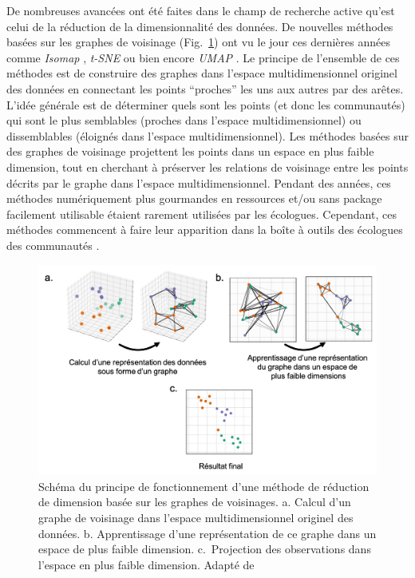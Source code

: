 \begin{refsection}
De nombreuses avancées ont été faites dans le champ de recherche active
qu'est celui de la réduction de la dimensionnalité des données. De
nouvelles méthodes basées sur les graphes de voisinage
(Fig.~\ref{fig:intro8}) ont vu le jour ces dernières années comme
\emph{Isomap} \autocite{Tenenbaum_2000}, \emph{t-SNE}
\autocite{vanderMaaten_2008} ou bien encore \emph{UMAP}
\autocite{McInnes_2020}. Le principe de l'ensemble de ces méthodes est
de construire des graphes dans l'espace multidimensionnel originel des
données en connectant les points ``proches'' les uns aux autres par des
arêtes. L'idée générale est de déterminer quels sont les points (et donc
les communautés) qui sont le plus semblables (proches dans l'espace
multidimensionnel) ou dissemblables (éloignés dans l'espace
multidimensionnel). Les méthodes basées sur des graphes de voisinage
projettent les points dans un espace en plus faible dimension, tout en
cherchant à préserver les relations de voisinage entre les points
décrits par le graphe dans l'espace multidimensionnel. Pendant des
années, ces méthodes numériquement plus gourmandes en ressources et/ou
sans package facilement utilisable étaient rarement utilisées par les
écologues. Cependant, ces méthodes commencent à faire leur apparition
dans la boîte à outils des écologues des communautés \autocites[
]{Roberts_2020}{Milosevic_2022}.

\clearpage

\begin{figure}
\hypertarget{fig:intro8}{%
\centering
\includegraphics{02-Introduction/figures/neighbor_graph_dimension_reduction_technic.png}
\caption[Schéma du principe de fonctionnement d'une méthode de réduction
de dimension basée sur les graphes de voisinages.]{Schéma du principe de fonctionnement d'une méthode de réduction
de dimension basée sur les graphes de voisinages. a. Calcul d'un graphe
de voisinage dans l'espace multidimensionnel originel des données. b.
Apprentissage d'une représentation de ce graphe dans un espace de plus
faible dimension. c.~Projection des observations dans l'espace en plus
faible dimension. Adapté de
\textcite{McInnes2018umap-software}}\label{fig:intro8}
}
\end{figure}


\end{refsection}
